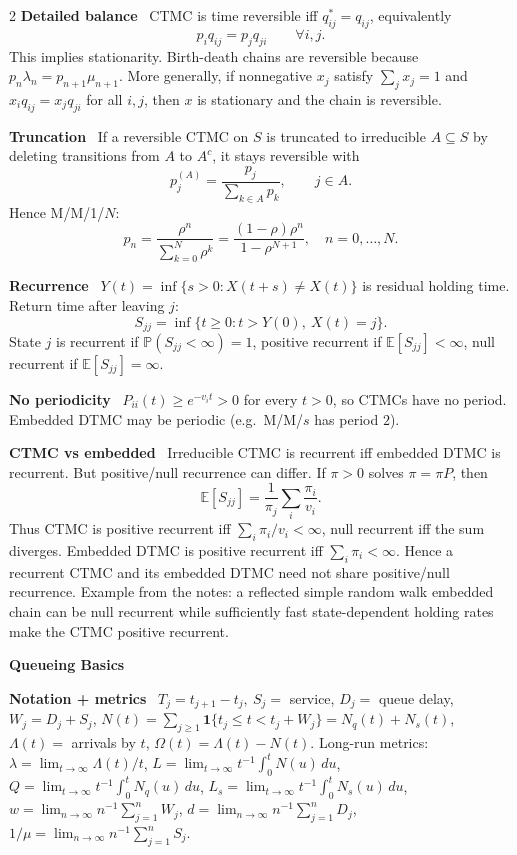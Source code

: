 \documentclass[10pt,fleqn]{article}
\newcommand{\PP}{\mathbb{P}}
\newcommand{\E}{\mathbb{E}}
\newcommand{\shead}[1]{\vspace{0.05ex}\textbf{\scriptsize #1}\par}
\newcommand{\topic}[1]{\textbf{#1}\ }
\begin{document}
\begin{multicols*}{2}
\topic{Detailed balance} CTMC is time reversible iff \(q^*_{ij}=q_{ij}\), equivalently
\[
p_iq_{ij}=p_jq_{ji}\qquad \forall i,j.
\]
This implies stationarity. Birth-death chains are reversible because \(p_n\lambda_n=p_{n+1}\mu_{n+1}\). More generally, if nonnegative \(x_j\) satisfy \(\sum_jx_j=1\) and \(x_iq_{ij}=x_jq_{ji}\) for all \(i,j\), then \(x\) is stationary and the chain is reversible.

\topic{Truncation} If a reversible CTMC on \(S\) is truncated to irreducible \(A\subseteq S\) by deleting transitions from \(A\) to \(A^c\), it stays reversible with
\[
p_j^{(A)}=\frac{p_j}{\sum_{k\in A}p_k},\qquad j\in A.
\]
Hence M/M/1/\(N\):
\[
p_n=\frac{\rho^n}{\sum_{k=0}^N\rho^k}=
\frac{(1-\rho)\rho^n}{1-\rho^{N+1}},\quad n=0,\dots,N.
\]

\topic{Recurrence} \(Y(t)=\inf\{s>0:X(t+s)\ne X(t)\}\) is residual holding time. Return time after leaving \(j\):
\[
S_{jj}=\inf\{t\ge0:t>Y(0),\ X(t)=j\}.
\]
State \(j\) is recurrent if \(\PP(S_{jj}<\infty)=1\), positive recurrent if \(\E[S_{jj}]<\infty\), null recurrent if \(\E[S_{jj}]=\infty\).

\topic{No periodicity} \(P_{ii}(t)\ge e^{-v_it}>0\) for every \(t>0\), so CTMCs have no period. Embedded DTMC may be periodic (e.g.\ M/M/\(s\) has period \(2\)).

\topic{CTMC vs embedded} Irreducible CTMC is recurrent iff embedded DTMC is recurrent. But positive/null recurrence can differ. If \(\pi>0\) solves \(\pi=\pi P\), then
\[
\E[S_{jj}]=\frac{1}{\pi_j}\sum_i\frac{\pi_i}{v_i}.
\]
Thus CTMC is positive recurrent iff \(\sum_i\pi_i/v_i<\infty\), null recurrent iff the sum diverges. Embedded DTMC is positive recurrent iff \(\sum_i\pi_i<\infty\). Hence a recurrent CTMC and its embedded DTMC need not share positive/null recurrence. Example from the notes: a reflected simple random walk embedded chain can be null recurrent while sufficiently fast state-dependent holding rates make the CTMC positive recurrent.

\shead{Queueing Basics}
\topic{Notation + metrics} \(T_j=t_{j+1}-t_j,\ S_j=\) service, \(D_j=\) queue delay, \(W_j=D_j+S_j\), \(N(t)=\sum_{j\ge1}\mathbf 1\{t_j\le t<t_j+W_j\}=N_q(t)+N_s(t)\), \(\Lambda(t)=\) arrivals by \(t\), \(\Omega(t)=\Lambda(t)-N(t)\). Long-run metrics: \(\lambda=\lim_{t\to\infty}\Lambda(t)/t\), \(L=\lim_{t\to\infty}t^{-1}\int_0^tN(u)\,du\), \(Q=\lim_{t\to\infty}t^{-1}\int_0^tN_q(u)\,du\), \(L_s=\lim_{t\to\infty}t^{-1}\int_0^tN_s(u)\,du\), \(w=\lim_{n\to\infty}n^{-1}\sum_{j=1}^nW_j\), \(d=\lim_{n\to\infty}n^{-1}\sum_{j=1}^nD_j\), \(1/\mu=\lim_{n\to\infty}n^{-1}\sum_{j=1}^nS_j\).


\end{multicols*}
\end{document}
